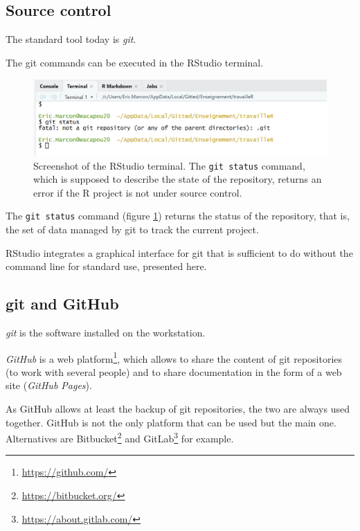 \documentclass[
  12pt,
  american,
  a4paper,
  extrafontsizes,onecolumn,openright
  ]{memoir}
\newlength{\rf}
\begin{document}
\hypertarget{sec:git-cds}{%
\subsection{Source control}\label{sec:git-cds}}

The standard tool today is \emph{git}.

The git commands can be executed in the RStudio terminal.



\scriptsize

\begin{figure}

{\centering \includegraphics[width=0.8\linewidth]{images/git-Status} 

}

\caption{Screenshot of the RStudio terminal. The \texttt{git\ status} command, which is supposed to describe the state of the repository, returns an error if the R project is not under source control.}\label{fig:git-Status}
\end{figure}

\normalsize

The \texttt{git\ status} command (figure \ref{fig:git-Status}) returns the status of the repository, that is, the set of data managed by git to track the current project.

RStudio integrates a graphical interface for git that is sufficient to do without the command line for standard use, presented here.

\hypertarget{git-and-github-1}{%
\subsection{git and GitHub}\label{git-and-github-1}}

\emph{git} is the software installed on the workstation.

\emph{GitHub} is a web platform\footnote{\url{https://github.com/}}, which allows to share the content of git repositories (to work with several people) and to share documentation in the form of a web site (\emph{GitHub Pages}).

As GitHub allows at least the backup of git repositories, the two are always used together.
GitHub is not the only platform that can be used but the main one.
Alternatives are Bitbucket\footnote{\url{https://bitbucket.org/}} and GitLab\footnote{\url{https://about.gitlab.com/}} for example.
\end{document}
